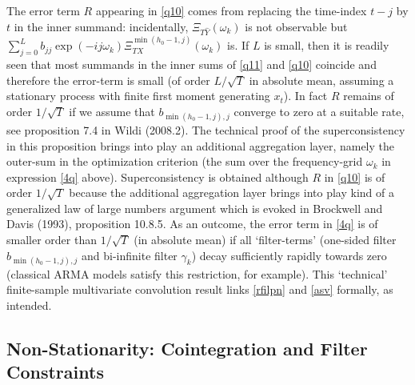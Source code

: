 \documentclass[11pt]{article}
\begin{document}
The error term $R$ appearing in \ref{q10} comes from replacing the time-index $t-j$ by $t$ in the inner summand: incidentally, $\Xi_{T\hat{Y}}(\omega_k)$ is not observable but $\sum_{j=0}^Lb_{jj}\exp(-ij\omega_k)\Xi_{TX}^{\min(h_0-1,j)}(\omega_k)$ is. If $L$ is small, then it is readily seen that most summands in the inner sums of \ref{q11} and \ref{q10} coincide and therefore the error-term is small (of order $L/\sqrt{T}$ in absolute mean, assuming a stationary process with finite first moment generating $x_t$). In fact $R$ remains of order $1/\sqrt{T}$ if we assume that $b_{\min(h_0-1,j),j}$ converge to zero at a suitable rate, see proposition 7.4 in Wildi (2008.2). The technical proof of the superconsistency in this proposition brings into play an additional aggregation layer, namely the outer-sum in the optimization criterion (the sum over the frequency-grid $\omega_k$ in expression \ref{4q} above). Superconsistency is obtained although $R$ in \ref{q10} is of order $1/\sqrt{T}$ because the additional aggregation layer brings into play kind of a generalized law of large numbers argument which is evoked in Brockwell and Davis (1993), proposition 10.8.5. As an outcome, the error term in \ref{4q} is of smaller order than $1/\sqrt{T}$ (in absolute mean) if all `filter-terms' (one-sided filter $b_{\min(h_0-1,j),j}$ and bi-infinite filter $\gamma_k$) decay sufficiently rapidly towards zero (classical ARMA models satisfy this restriction, for example). This `technical' finite-sample multivariate convolution result links \ref{rfilpn} and \ref{asv} formally, as intended.

\subsection{Non-Stationarity: Cointegration and Filter Constraints}\label{fc}
\end{document}
